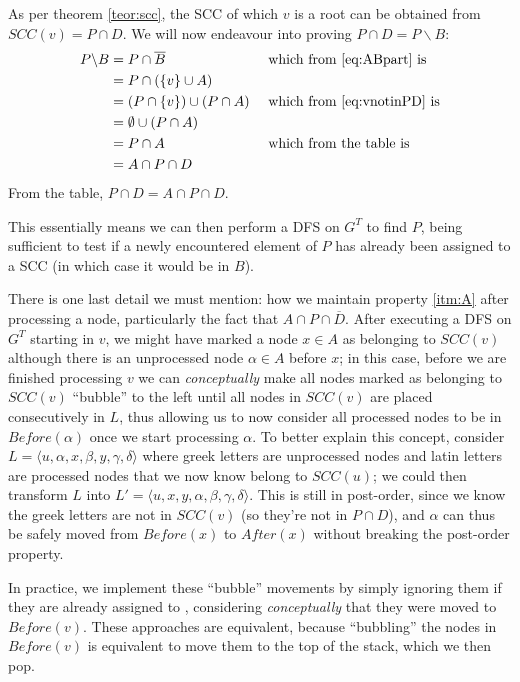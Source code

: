 As per theorem \ref{teor:scc}, the SCC of which $v$ is a root can be obtained from $SCC(v)=P \cap D$. We will now endeavour into proving $P \cap D = P \backslash B$:
\begin{alignat*}{2}
    P \backslash B &= P \cap \overline{B}&&\text{ which from \eqref{eq:ABpart} is} \\
                   &= P \cap (\{v\} \cup A) && \\
                   &= (P \cap \{v\}) \cup (P \cap A)&&\text{ which from \eqref{eq:vnotinPD} is}\\
                   &= \emptyset \cup (P \cap A)&&\\
                   &= P \cap A &&\text{ which from the table is }\\
                   &= A \cap P \cap D &&
\end{alignat*}
From the table, $P \cap D = A \cap P \cap D$.\par
This essentially means we can then perform a \acrshort{DFS} on $G^T$ to find $P$, being sufficient to test if a newly encountered element of $P$ has already been assigned to a \acrshort{SCC} (in which case it would be in $B$).\par
There is one last detail we must mention: how we maintain property \ref{itm:A} after processing a node, particularly the fact that \sout{$A \cap P \cap \overline{D}$}. After executing a \acrshort{DFS} on $G^T$ starting in $v$, we might have marked a node $x \in A$ as belonging to $SCC(v)$ although there is an unprocessed node $\alpha \in A$ before $x$; in this case, before we are finished processing $v$ we can \emph{conceptually} make all nodes marked as belonging to $SCC(v)$ ``bubble'' to the left until all nodes in $SCC(v)$ are placed consecutively in $L$, thus allowing us to now consider all processed nodes to be in $Before(\alpha)$ once we start processing $\alpha$. To better explain this concept, consider $L=\langle u, \alpha, x, \beta, y, \gamma, \delta \rangle $ where greek letters are unprocessed nodes and latin letters are processed nodes that we now know belong to $SCC(u)$; we could then transform $L$ into $L'=\langle u, x, y, \alpha, \beta, \gamma, \delta \rangle$. This is still in post-order, since we know the greek letters are not in $SCC(v)$ (so they're not in $P \cap D$), and $\alpha$ can thus be safely moved from $Before(x)$ to $After(x)$ without breaking the post-order property.\par
In practice, we implement these ``bubble'' movements by simply ignoring them if they are already assigned to , considering \emph{conceptually} that they were moved to $Before(v)$. These approaches are equivalent, because ``bubbling'' the nodes in $Before(v)$ is equivalent to move them to the top of the stack, which we then pop. 


